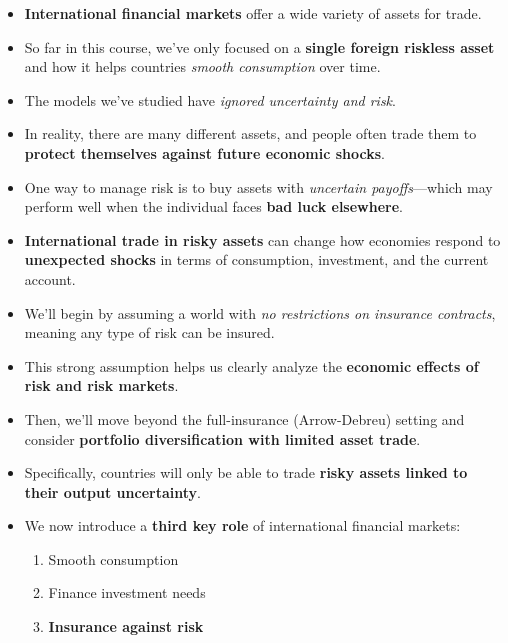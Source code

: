 \documentclass[12pt]{article}
\begin{document}
\begin{itemize}
\item \textbf{International financial markets} offer a wide variety of assets for trade.

\item So far in this course, we’ve only focused on a \textbf{single foreign riskless asset} and how it helps countries \textit{smooth consumption} over time.

\item The models we’ve studied have \textit{ignored uncertainty and risk}.

\item In reality, there are many different assets, and people often trade them to \textbf{protect themselves against future economic shocks}.

\item One way to manage risk is to buy assets with \textit{uncertain payoffs}—which may perform well when the individual faces \textbf{bad luck elsewhere}.

\item \textbf{International trade in risky assets} can change how economies respond to \textbf{unexpected shocks} in terms of consumption, investment, and the current account.

\item We'll begin by assuming a world with \textit{no restrictions on insurance contracts}, meaning any type of risk can be insured.

\item This strong assumption helps us clearly analyze the \textbf{economic effects of risk and risk markets}.

\item Then, we’ll move beyond the full-insurance (Arrow-Debreu) setting and consider \textbf{portfolio diversification with limited asset trade}.

\item Specifically, countries will only be able to trade \textbf{risky assets linked to their output uncertainty}.

\item We now introduce a \textbf{third key role} of international financial markets:
  \begin{enumerate}
    \item Smooth consumption
    \item Finance investment needs
    \item \textbf{Insurance against risk}
  \end{enumerate}


\end{itemize}
\end{document}
